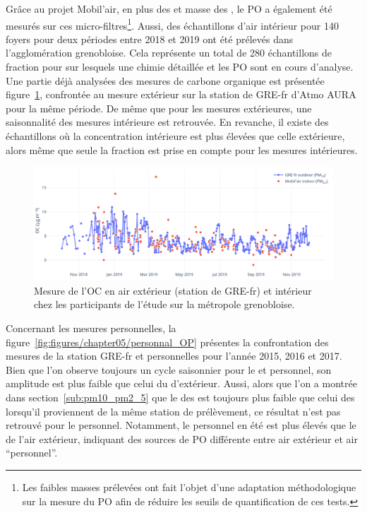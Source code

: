 Grâce au projet Mobil'air, en plus des  et masse des \PMdc, le PO a également été
mesurés sur ces micro-filtres\footnote{Les faibles masses prélevées ont fait l'objet
    d'une adaptation méthodologique sur la mesure du PO afin de réduire les seuils de
quantification de ces tests.}.
Aussi, des échantillons d'air intérieur pour 140 foyers pour deux périodes entre 2018 et
2019 ont été prélevés dans l'agglomération grenobloise. Cela représente un total de 280
échantillons de fraction \PMdc{} pour sur lesquels une chimie détaillée et les PO sont en
cours d'analyse. Une partie déjà analysées des mesures de carbone organique est présentée
figure~\ref{fig:figures/chapter05/OC_mobilair}, confrontée au mesure extérieur sur la
station de GRE-fr d'Atmo AURA pour la même période. De même que pour les mesures extérieures,
une saisonnalité des mesures intérieure est retrouvée.
En revanche, il existe
des échantillons où la concentration intérieure est plus élevées que celle extérieure,
alors même que seule la fraction \PMdc{} est prise en compte pour les mesures intérieures.

\begin{figure}[ht]
    \centering
    \includegraphics[width=1.\linewidth]{figures/chapter05/OC_mobilair.png}
    \caption{Mesure de l'OC en air extérieur (station de GRE-fr) et intérieur chez les
    participants de l'étude sur la métropole grenobloise.}%
    \label{fig:figures/chapter05/OC_mobilair}
\end{figure}

Concernant les mesures personnelles, la figure~\ref{fig:figures/chapter05/personnal_OP}
présentes la confrontation des mesures de la station GRE-fr et personnelles pour l'année
2015, 2016 et 2017. Bien que l'on observe toujours un cycle saisonnier pour le \POAAv{} et
\PODTTv{} personnel, son amplitude est plus faible que celui du \POv{} d'extérieur. Aussi,
alors que l'on a montrée dans section~\ref{sub:pm10_pm2_5} que le \POv{} des \PMdc{} est
toujours plus faible que celui des \PMdix{} lorsqu'il proviennent de la même station de
prélèvement, ce résultat n'est pas retrouvé pour le \POv{} personnel. Notamment, le \POv{}
personnel en été est plus élevés que le \POv{} de l'air extérieur, indiquant des sources
de PO différente entre air extérieur et air ``personnel''.

